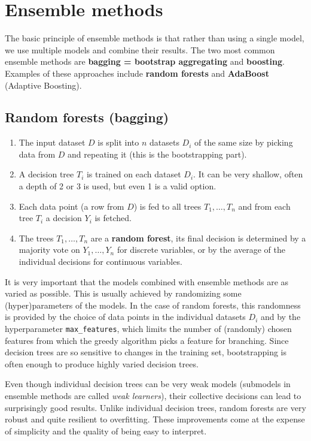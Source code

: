 \documentclass[a4paper]{article}
\begin{document}
	\section{Ensemble methods}
	The basic principle of ensemble methods is that rather than using a single model,
	we use multiple models and combine their results. The two most common ensemble methods
	are \textbf{bagging = bootstrap aggregating} and \textbf{boosting}. Examples of these
	approaches include \textbf{random forests} and \textbf{AdaBoost} (Adaptive Boosting).

	\subsection{Random forests (bagging)}
	\begin{enumerate}
		\item The input dataset $D$ is split into $n$ datasets $D_i$ of the same size by picking
			data from $D$ and repeating it (this is the bootstrapping part).
		\item A decision tree $T_i$ is trained on each dataset $D_i$. It can be very shallow,
			often a depth of 2 or 3 is used, but even 1 is a valid option.
		\item Each data point (a row from $D$) is fed to all trees $T_1, \ldots, T_n$ and
			from each tree $T_i$ a decision $Y_i$ is fetched.
		\item The trees $T_1, \ldots, T_n$ are a \textbf{random forest}, its final decision is determined
			by a majority vote on $Y_1, \ldots, Y_n$ for discrete variables, or by the
			average of the individual decisions for continuous variables.
	\end{enumerate}

	It is very important that the models combined with ensemble methods are as varied as
	possible. This is usually achieved by randomizing some (hyper)parameters of the models.
	In the case of random forests, this randomness is provided by the choice of data points
	in the individual datasets $D_i$ and by the hyperparameter \texttt{max\_features}, which
	limits the number of (randomly) chosen features from which the greedy algorithm picks
	a feature for branching. Since decision trees are so sensitive to changes in the
	training set, bootstrapping is often enough to produce highly varied decision trees.

	Even though individual decision trees can be very weak models (submodels in ensemble
	methods are called \textit{weak learners}), their collective decisions can lead to
	surprisingly good results. Unlike individual decision trees, random forests are very
	robust and quite resilient to overfitting. These improvements come at the expense
	of simplicity and the quality of being easy to interpret.
\end{document}

